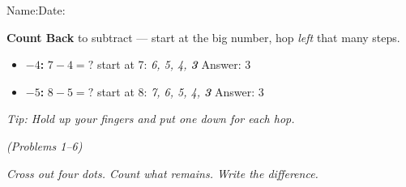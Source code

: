\documentclass[12pt, letterpaper]{article}
\begin{document}

{\small Name:\ansblanklg \hfill Date:\ansblank}
\goldrule

\begin{instructbox}
\textbf{Count Back} to subtract — start at the big number, hop \emph{left} that many steps.
\begin{itemize}
  \item \textbf{$-4$:} \quad $7-4=?$ \quad start at 7: \textit{6, 5, 4, \textbf{3}} \quad Answer: 3
  \item \textbf{$-5$:} \quad $8-5=?$ \quad start at 8: \textit{7, 6, 5, 4, \textbf{3}} \quad Answer: 3
\end{itemize}
\textit{Tip: Hold up your fingers and put one down for each hop.}
\end{instructbox}

\bigskip
{} \hfill \textit{(Problems 1–6)}

\medskip
\noindent\textit{Cross out four dots. Count what remains. Write the difference.}
\end{document}
